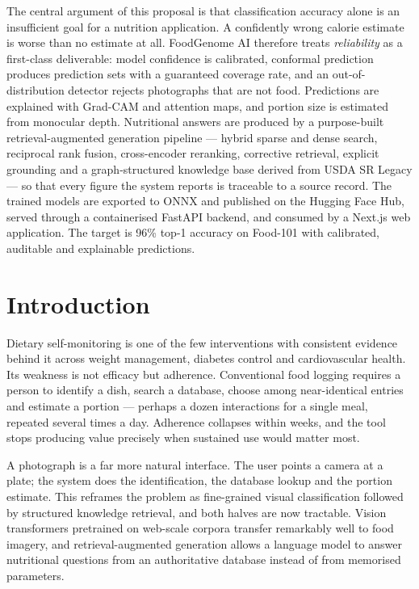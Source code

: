 \documentclass[12pt,a4paper,oneside]{report}
\begin{document}
The central argument of this proposal is that classification accuracy alone is
an insufficient goal for a nutrition application. A confidently wrong calorie
estimate is worse than no estimate at all. FoodGenome AI therefore treats
\emph{reliability} as a first-class deliverable: model confidence is calibrated,
conformal prediction produces prediction sets with a guaranteed coverage rate,
and an out-of-distribution detector rejects photographs that are not food.
Predictions are explained with Grad-CAM and attention maps, and portion size is
estimated from monocular depth. Nutritional answers are produced by a
purpose-built retrieval-augmented generation pipeline --- hybrid sparse and
dense search, reciprocal rank fusion, cross-encoder reranking, corrective
retrieval, explicit grounding and a graph-structured knowledge base derived from
USDA SR Legacy --- so that every figure the system reports is traceable to a
source record. The trained models are exported to ONNX and published on the
Hugging Face Hub, served through a containerised FastAPI backend, and consumed
by a Next.js web application. The target is 96\% top-1 accuracy on Food-101 with
calibrated, auditable and explainable predictions.

\chapter{Introduction}

Dietary self-monitoring is one of the few interventions with consistent evidence
behind it across weight management, diabetes control and cardiovascular health.
Its weakness is not efficacy but adherence. Conventional food logging requires a
person to identify a dish, search a database, choose among near-identical
entries and estimate a portion --- perhaps a dozen interactions for a single
meal, repeated several times a day. Adherence collapses within weeks, and the
tool stops producing value precisely when sustained use would matter most.

A photograph is a far more natural interface. The user points a camera at a
plate; the system does the identification, the database lookup and the portion
estimate. This reframes the problem as fine-grained visual classification
followed by structured knowledge retrieval, and both halves are now tractable.
Vision transformers pretrained on web-scale corpora transfer remarkably well to
food imagery, and retrieval-augmented generation allows a language model to
answer nutritional questions from an authoritative database instead of from
memorised parameters.
\end{document}
